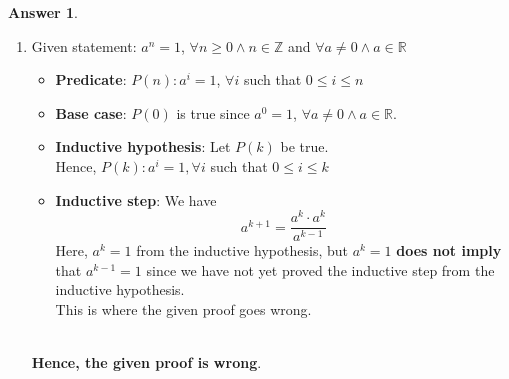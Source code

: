 \documentclass[a4paper]{article}
\theoremstyle{definition}
\newtheorem{answer}{Answer}
\begin{document}
\begin{answer}\
    \begin{enumerate}
        \item Given statement: $a^n = 1$, $\forall n \ge 0 \land n \in \mathbb{Z}$ and $\forall a \neq 0 \land a \in \mathbb{R}$
        \begin{itemize}
            \item \textbf{Predicate}: $P(n): a^i = 1$, $\forall i$ such that $0 \le i \le n$
            \item  \textbf{Base case}: $P(0)$ is true since $a^0 = 1$, $\forall a \neq 0 \land a \in \mathbb{R}$.
            \item \textbf{Inductive hypothesis}: Let $P(k)$ be true.\\
            Hence, $P(k): a^i = 1, \forall i$ such that $0 \le i \le k$
            \item \textbf{Inductive step}: We have
                    \begin{equation*}
                        a^{k+1} = \frac{a^k \cdot a^k}{a^{k-1}}
                    \end{equation*}
            Here, $a^k = 1$ from the inductive hypothesis, but $a^k = 1$ \textbf{does not imply} that $a^{k-1} = 1$ since we have not yet proved the inductive step from the inductive hypothesis.\\
            This is where the given proof goes wrong.\\\\
        \end{itemize}
            \textbf{Hence, the given proof is wrong}.
        

\end{enumerate}
\end{answer}
\end{document}
